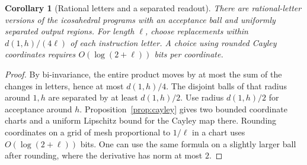 \documentclass[11pt,reqno]{amsart}
\newtheorem{corollary}[theorem]{Corollary}
\theoremstyle{definition}
\theoremstyle{remark}
\numberwithin{equation}{section}
\begin{document}
\begin{corollary}[Rational letters and a separated readout]\label{m6:rational-word}
There are rational-letter versions of the icosahedral
programs with an acceptance ball and uniformly separated
output regions.
For length \(\ell\), choose replacements within
\(d(1,h)/(4\ell)\) of each instruction letter.
A choice using rounded Cayley coordinates requires
\(O(\log(2+\ell))\) bits per coordinate.
\end{corollary}
\begin{proof}
By bi-invariance, the entire product moves by at most the sum
of the changes in letters, hence at most \(d(1,h)/4\).
The disjoint balls of that radius around \(1,h\) are separated
by at least \(d(1,h)/2\). Use radius \(d(1,h)/2\) for acceptance
around \(h\). Proposition~\ref{prop:cayley} gives two bounded
coordinate charts and a uniform Lipschitz bound for the Cayley
map there. Rounding coordinates on a grid of mesh proportional
to \(1/\ell\) in a chart uses \(O(\log(2+\ell))\) bits.
One can use the same formula on a slightly larger ball after
rounding, where the derivative has norm at most \(2\).
\end{proof}
\end{document}

